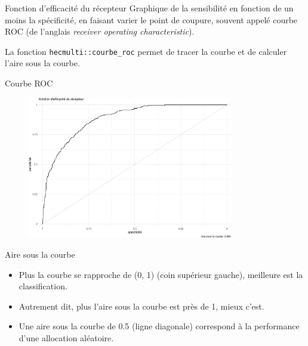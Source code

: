 \documentclass[
  ignorenonframetext,
]{beamer}
\newenvironment{Shaded}{\begin{snugshade}}{\end{snugshade}}
\newcommand{\AttributeTok}[1]{\textcolor[rgb]{0.40,0.45,0.13}{#1}}
\newcommand{\ConstantTok}[1]{\textcolor[rgb]{0.56,0.35,0.01}{#1}}
\newcommand{\DocumentationTok}[1]{\textcolor[rgb]{0.37,0.37,0.37}{\textit{#1}}}
\newcommand{\FunctionTok}[1]{\textcolor[rgb]{0.28,0.35,0.67}{#1}}
\newcommand{\NormalTok}[1]{\textcolor[rgb]{0.00,0.23,0.31}{#1}}
\newcommand{\OtherTok}[1]{\textcolor[rgb]{0.00,0.23,0.31}{#1}}
\newcommand{\SpecialCharTok}[1]{\textcolor[rgb]{0.37,0.37,0.37}{#1}}
\providecommand{\tightlist}{%
  \setlength{\itemsep}{0pt}\setlength{\parskip}{0pt}}\usepackage{longtable,booktabs,array}
\begin{document}
\begin{frame}[fragile]{Fonction d'efficacité du récepteur}
\protect\hypertarget{fonction-defficacituxe9-du-ruxe9cepteur}{}
Graphique de la sensibilité en fonction de un moins la spécificité, en
faisant varier le point de coupure, souvent appelé courbe ROC (de
l'anglais \emph{receiver operating characteristic}).

La fonction \texttt{hecmulti::courbe\_roc} permet de tracer la courbe et
de calculer l'aire sous la courbe.

\begin{Shaded}
\end{Shaded}
\end{frame}

\begin{frame}{Courbe ROC}
\protect\hypertarget{courbe-roc}{}
\begin{figure}

{\centering \includegraphics[width=0.8\textwidth,height=\textheight]{MATH60602-diapos7_files/figure-beamer/unnamed-chunk-15-1.pdf}

}

\end{figure}
\end{frame}

\begin{frame}{Aire sous la courbe}
\protect\hypertarget{aire-sous-la-courbe}{}
\begin{itemize}
\tightlist
\item
  Plus la courbe se rapproche de (0, 1) (coin supérieur gauche),
  meilleure est la classification.
\item
  Autrement dit, plus l'aire sous la courbe est près de 1, mieux c'est.
\item
  Une aire sous la courbe de 0.5 (ligne diagonale) correspond à la
  performance d'une allocation aléatoire.
\end{itemize}
\end{frame}
\end{document}
